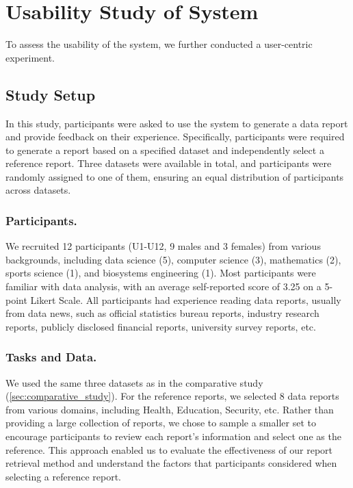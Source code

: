 \section{Usability Study of \system{} System}
\label{sec:user_study}

To assess the usability of the \system{} system, we further conducted a user-centric experiment. 

\subsection{Study Setup}

In this study, participants were asked to use the \system{} system to generate a data report and provide feedback on their experience.
Specifically, participants were required to generate a report based on a specified dataset and independently select a reference report.
Three datasets were available in total, and participants were randomly assigned to one of them, ensuring an equal distribution of participants across datasets.

\subsubsection{Participants. }
We recruited 12 participants (U1-U12, 9 males and 3 females) from various backgrounds, including data science (5), computer science (3), mathematics (2), sports science (1), and biosystems engineering (1). 
Most participants were familiar with data analysis, with an average self-reported score of 3.25 on a 5-point Likert Scale. 
All participants had experience reading data reports, usually from data news, such as official statistics bureau reports, industry research reports, publicly disclosed financial reports, university survey reports, etc.

\subsubsection{Tasks and Data. }

We used the same three datasets as in the comparative study (\autoref{sec:comparative_study}).
For the reference reports, we selected 8 data reports from various domains, including Health, Education, Security, etc.
Rather than providing a large collection of reports, we chose to sample a smaller set to encourage participants to review each report's information and select one as the reference. 
This approach enabled us to evaluate the effectiveness of our report retrieval method and understand the factors that participants considered when selecting a reference report.

